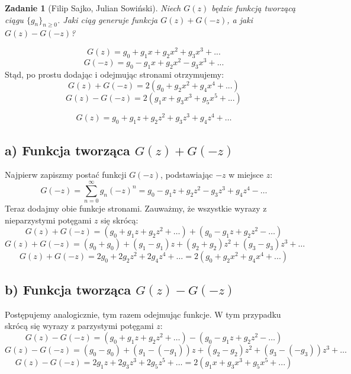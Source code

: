 \documentclass{mwart}
\newtheorem{zad}{Zadanie}[section]
\begin{document}
\begin{zad}[Filip Sajko, Julian Sowiński]
    Niech $G(z)$ będzie funkcją tworzącą ciągu $\{g_n\}_{n \geq 0}$.
    Jaki ciąg generuje funkcja $G(z) + G(-z)$, a jaki $G(z) - G(-z)$?
\end{zad}
\begin{mdframed}
    \[G( z) = g_0 + g_1x + g_2x^2 + g_3x^3  + ...\]
    \[G(-z) = g_0 - g_1x + g_2x^2  - g_3x^3 + ...\]
    Stąd, po prostu dodając i odejmując stronami otrzymujemy:
    \[G(z) + G(-z) = 2(g_0 + g_2x^2 + g_4x^4 + ...)\]
    \[G(z) - G(-z) = 2(g_1x + g_3x^3 + g_5x^5 + ...)\]
\end{mdframed}
\begin{mdframed}
    $$ G(z) = g_0 + g_1 z + g_2 z^2 + g_3 z^3 + g_4 z^4 + \dots $$
    
    \subsection*{a) Funkcja tworząca $G(z) + G(-z)$}
    
    Najpierw zapiszmy postać funkcji $G(-z)$, podstawiając $-z$ w miejsce $z$:
    $$ G(-z) = \sum_{n=0}^{\infty} g_n (-z)^n = g_0 - g_1 z + g_2 z^2 - g_3 z^3 + g_4 z^4 - \dots $$
    Teraz dodajmy obie funkcje stronami. Zauważmy, że wszystkie wyrazy z nieparzystymi potęgami $z$ się skrócą:
    $$ G(z) + G(-z) = (g_0 + g_1 z + g_2 z^2 + \dots) + (g_0 - g_1 z + g_2 z^2 - \dots) $$
    $$ G(z) + G(-z) = (g_0+g_0) + (g_1-g_1)z + (g_2+g_2)z^2 + (g_3-g_3)z^3 + \dots $$
    $$ G(z) + G(-z) = 2g_0 + 2g_2 z^2 + 2g_4 z^4 + \dots = 2(g_0 + g_2x^2 + g_4x^4 + ...)$$

    \subsection*{b) Funkcja tworząca $G(z) - G(-z)$}

    Postępujemy analogicznie, tym razem odejmując funkcje. W tym przypadku skrócą się wyrazy z parzystymi potęgami $z$:
    $$ G(z) - G(-z) = (g_0 + g_1 z + g_2 z^2 + \dots) - (g_0 - g_1 z + g_2 z^2 - \dots) $$
    $$ G(z) - G(-z) = (g_0-g_0) + (g_1-(-g_1))z + (g_2-g_2)z^2 + (g_3-(-g_3))z^3 + \dots $$
    $$ G(z) - G(-z) = 2g_1 z + 2g_3 z^3 + 2g_5 z^5 + \dots = 2(g_1x + g_3x^3 + g_5x^5 + ...)$$
\end{mdframed}
\end{document}
